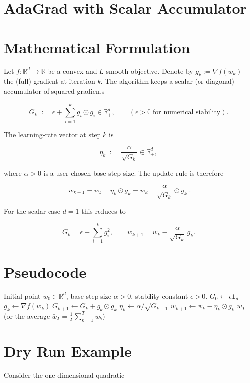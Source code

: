 \documentclass{article}
\newcommand{\R}{\mathbb{R}}
\begin{document}
\section*{AdaGrad with Scalar Accumulator}

\section*{Mathematical Formulation}
Let $f:\R^d\to\R$ be a convex and $L$‑smooth objective.  
Denote by $g_k:=\nabla f(w_k)$ the (full) gradient at iteration $k$.  
The algorithm keeps a scalar (or diagonal) accumulator of squared gradients  

\[
G_k \;:=\; \epsilon+\sum_{i=1}^{k} g_i\odot g_i\in\R_{+}^{d},
\qquad (\epsilon>0\text{ for numerical stability}).
\]

The learning‑rate vector at step $k$ is  

\[
\eta_k \;:=\; \frac{\alpha}{\sqrt{G_k}}\in\R_{+}^{d},
\]

where $\alpha>0$ is a user‑chosen base step size.  
The update rule is therefore  

\[
\boxed{ \; w_{k+1}= w_k - \eta_k\odot g_k
      = w_k - \frac{\alpha}{\sqrt{G_k}}\odot g_k \; } .
\]

For the scalar case $d=1$ this reduces to  

\[
G_k = \epsilon +\sum_{i=1}^{k} g_i^{2},\qquad 
w_{k+1}= w_k - \frac{\alpha}{\sqrt{G_k}}\,g_k .
\]

\section*{Pseudocode}
\begin{algorithm}[H]
\caption{AdaGrad (scalar/diagonal version)}\label{alg:adagrad}
\begin{algorithmic}[1]
\Require Initial point $w_0\in\R^{d}$, base step size $\alpha>0$, 
        stability constant $\epsilon>0$.
\State $G_0 \gets \epsilon\mathbf{1}_d$ 
    \State $g_k \gets \nabla f(w_k)$
    \State $G_{k+1} \gets G_k + g_k\odot g_k$
    \State $\eta_k \gets \alpha / \sqrt{G_{k+1}}$ 
    \State $w_{k+1} \gets w_k - \eta_k\odot g_k$
\EndFor
\State \Return $w_T$ (or the average $\bar w_T=\tfrac1T\sum_{k=1}^{T}w_k$)
\end{algorithmic}
\end{algorithm}

\section*{Dry Run Example}
Consider the one‑dimensional quadratic  
\end{document}
